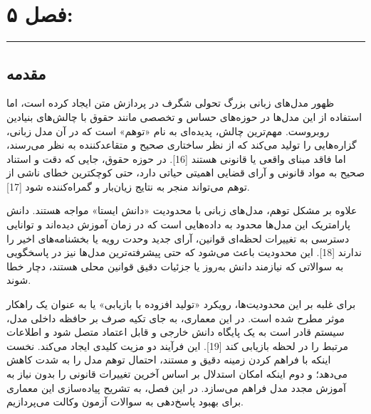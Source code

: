 \documentclass[12pt,a4paper]{report}
\begin{document}
	\sloppy
	
	
	\chapter*{\bfseries فصل ۵: }
	
	\vspace{-2em}
	\noindent\rule{\textwidth}{0.5pt}
	\vspace{0.5em}
	
	\section{مقدمه}
	
	ظهور مدل‌های زبانی بزرگ تحولی شگرف در پردازش متن ایجاد کرده است، اما استفاده از این مدل‌ها در حوزه‌های حساس و تخصصی مانند حقوق با چالش‌های بنیادین روبروست. مهم‌ترین چالش، پدیده‌ای به نام «توهم»  است که در آن مدل زبانی، گزاره‌هایی را تولید می‌کند که از نظر ساختاری صحیح و متقاعدکننده به نظر می‌رسند، اما فاقد مبنای واقعی یا قانونی هستند [16]. در حوزه حقوق، جایی که دقت و استناد صحیح به مواد قانونی و آرای قضایی اهمیتی حیاتی دارد، حتی کوچکترین خطای ناشی از توهم می‌تواند منجر به نتایج زیان‌بار و گمراه‌کننده شود [17].
	
	علاوه بر مشکل توهم، مدل‌های زبانی با محدودیت «دانش ایستا»  مواجه هستند. دانش پارامتریک این مدل‌ها محدود به داده‌هایی است که در زمان آموزش دیده‌اند و توانایی دسترسی به تغییرات لحظه‌ای قوانین، آرای جدید وحدت رویه یا بخشنامه‌های اخیر را ندارند [18]. این محدودیت باعث می‌شود که حتی پیشرفته‌ترین مدل‌ها نیز در پاسخگویی به سوالاتی که نیازمند دانش به‌روز یا جزئیات دقیق قوانین محلی هستند، دچار خطا شوند.
	
	برای غلبه بر این محدودیت‌ها، رویکرد «تولید افزوده با بازیابی»  یا به عنوان یک راهکار موثر مطرح شده است. در این معماری، به جای تکیه صرف بر حافظه داخلی مدل، سیستم قادر است به یک پایگاه دانش خارجی و قابل اعتماد متصل شود و اطلاعات مرتبط را در لحظه بازیابی کند [19]. این فرآیند دو مزیت کلیدی ایجاد می‌کند. نخست اینکه با فراهم کردن زمینه  دقیق و مستند، احتمال توهم مدل را به شدت کاهش می‌دهد؛ و دوم اینکه امکان استدلال بر اساس آخرین تغییرات قانونی را بدون نیاز به آموزش مجدد مدل فراهم می‌سازد. در این فصل، به تشریح پیاده‌سازی این معماری برای بهبود پاسخ‌دهی به سوالات آزمون وکالت می‌پردازیم.
	
\end{document}
